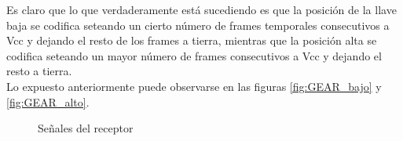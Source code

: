 \documentclass[main]{subfiles}
\begin{document}
Es claro que lo que verdaderamente está sucediendo es que la posición de la llave baja se codifica seteando un cierto número de  frames temporales consecutivos a Vcc y dejando el resto de los frames a tierra, mientras que la posición alta se codifica seteando un mayor número de frames consecutivos a Vcc y dejando el resto a tierra.\\

Lo expuesto anteriormente puede observarse en las figuras \ref{fig:GEAR_bajo} y \ref{fig:GEAR_alto}.

\begin{figure}
\centering
  \caption{Se\~nales del receptor}
  \label{fig:senal_switcheo}
\end{figure}
%
%

\end{document}
